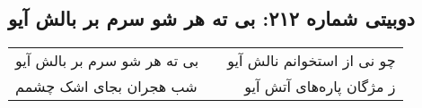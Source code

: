 \begin{center}
\section*{دوبیتی شماره ۲۱۲: بی ته هر شو سرم بر بالش آیو}
\label{sec:212}
\begin{longtable}{l p{0.5cm} r}
بی ته هر شو سرم بر بالش آیو
&&
چو نی از استخوانم نالش آیو
\\
شب هجران بجای اشک چشمم
&&
ز مژگان پاره‌های آتش آیو
\\
\end{longtable}
\end{center}
